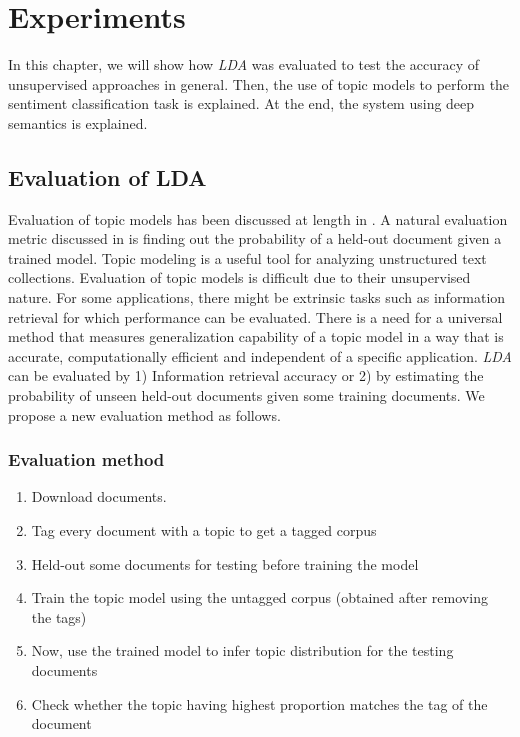 \chapter{Experiments} %

\label{experiments} %




In this chapter, we will show how \textit{LDA} was evaluated to test the accuracy of unsupervised approaches in general. Then, the use of topic
models to perform the sentiment classification task is explained. At the end, the system using deep semantics is explained.

\section{Evaluation of LDA}

Evaluation of topic models has been discussed at length in \citep*{wallach2009evaluation}. A natural evaluation metric discussed in 
\citep*{wallach2009evaluation} is finding out the probability of a held-out document given a trained model. Topic modeling is a useful
tool for analyzing unstructured text collections. Evaluation of topic models is difficult due to their unsupervised nature. For some 
applications, there might be extrinsic tasks such as information retrieval for which performance can be evaluated. There is a need for 
a universal method that measures generalization capability of a topic model in a way that is accurate, computationally efficient and
independent of a specific application. \textit{LDA} can be evaluated by 1) Information retrieval accuracy or 2) by estimating the probability
of unseen held-out documents given some training documents. We propose a new evaluation method as follows.

\subsection*{Evaluation method}

\begin{enumerate}
 \item Download documents.
 \item Tag every document with a topic to get a tagged corpus
 \item Held-out some documents for testing before training the model
 \item Train the topic model using the untagged corpus (obtained after removing the tags)
 \item Now, use the trained model to infer topic distribution for the testing documents
 \item Check whether the topic having highest proportion matches the tag of the document
\end{enumerate}

